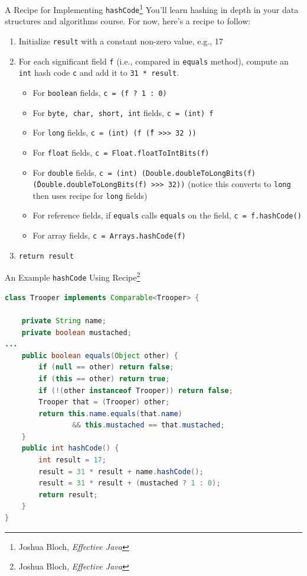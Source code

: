 \documentclass{beamer}
\begin{document}
\begin{frame}[fragile]{A Recipe for Implementing {\tt hashCode}\footnote{Joshua Bloch, {\it Effective Java}}}
\vspace{-.05in}
You'll learn hashing in depth in your data structures and algorithms course.  For now, here's a recipe to follow:

\begin{enumerate}
\item Initialize {\tt result} with a constant non-zero value, e.g., 17
\item For each significant field {\tt f} (i.e., compared in {\tt equals} method), compute an {\tt int} hash code {\tt c} and add it to {\tt 31 * result}.
\begin{itemize}
\item For {\tt boolean} fields, {\tt c = (f ? 1 : 0)}
\item For {\tt byte, char, short, int} fields, {\tt c = (int) f}
\item For {\tt long} fields, {\tt c = (int) (f \^ (f >>> 32 ))}
\item For {\tt float} fields, {\tt c = Float.floatToIntBits(f)}
\item For {\tt double} fields, {\tt c = (int) (Double.doubleToLongBits(f) \^ (Double.doubleToLongBits(f) >>> 32))} (notice this converts to {\tt long} then uses recipe for {\tt long} fields)
\item For reference fields, if {\tt equals} calls {\tt equals} on the field, {\tt c = f.hashCode()}
\item For array fields, {\tt c = Arrays.hashCode(f)}
\end{itemize}
\item {\tt return result}
\end{enumerate}

\end{frame}

\begin{frame}[fragile]{An Example {\tt hashCode} Using Recipe\footnote{Joshua Bloch, {\it Effective Java}}}

\begin{lstlisting}[language=Java]
class Trooper implements Comparable<Trooper> {

    private String name;
    private boolean mustached;
...
    public boolean equals(Object other) {
        if (null == other) return false;
        if (this == other) return true;
        if (!(other instanceof Trooper)) return false;
        Trooper that = (Trooper) other;
        return this.name.equals(that.name)
                && this.mustached == that.mustached;
    }
    public int hashCode() {
        int result = 17;
        result = 31 * result + name.hashCode();
        result = 31 * result + (mustached ? 1 : 0);
        return result;
    }
}
\end{lstlisting}

\end{frame}
\end{document}
